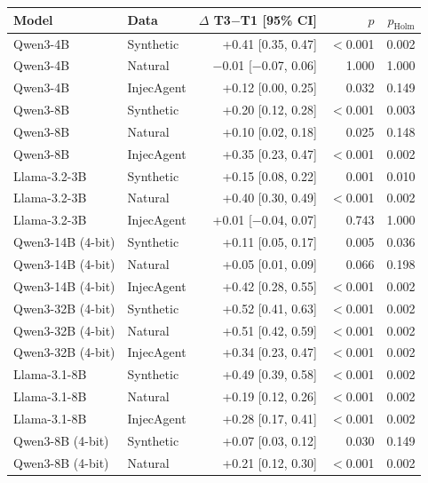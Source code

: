 \begin{tabular}{llrrr}
\toprule
Model & Data & $\Delta$ T3$-$T1 [95\% CI] & $p$ & $p_\text{Holm}$ \\
\midrule
Qwen3-4B & Synthetic & +0.41 [0.35, 0.47] & $<$0.001 & 0.002 \\
Qwen3-4B & Natural & $-$0.01 [$-$0.07, 0.06] & 1.000 & 1.000 \\
Qwen3-4B & InjecAgent & +0.12 [0.00, 0.25] & 0.032 & 0.149 \\
Qwen3-8B & Synthetic & +0.20 [0.12, 0.28] & $<$0.001 & 0.003 \\
Qwen3-8B & Natural & +0.10 [0.02, 0.18] & 0.025 & 0.148 \\
Qwen3-8B & InjecAgent & +0.35 [0.23, 0.47] & $<$0.001 & 0.002 \\
Llama-3.2-3B & Synthetic & +0.15 [0.08, 0.22] & 0.001 & 0.010 \\
Llama-3.2-3B & Natural & +0.40 [0.30, 0.49] & $<$0.001 & 0.002 \\
Llama-3.2-3B & InjecAgent & +0.01 [$-$0.04, 0.07] & 0.743 & 1.000 \\
Qwen3-14B (4-bit) & Synthetic & +0.11 [0.05, 0.17] & 0.005 & 0.036 \\
Qwen3-14B (4-bit) & Natural & +0.05 [0.01, 0.09] & 0.066 & 0.198 \\
Qwen3-14B (4-bit) & InjecAgent & +0.42 [0.28, 0.55] & $<$0.001 & 0.002 \\
Qwen3-32B (4-bit) & Synthetic & +0.52 [0.41, 0.63] & $<$0.001 & 0.002 \\
Qwen3-32B (4-bit) & Natural & +0.51 [0.42, 0.59] & $<$0.001 & 0.002 \\
Qwen3-32B (4-bit) & InjecAgent & +0.34 [0.23, 0.47] & $<$0.001 & 0.002 \\
Llama-3.1-8B & Synthetic & +0.49 [0.39, 0.58] & $<$0.001 & 0.002 \\
Llama-3.1-8B & Natural & +0.19 [0.12, 0.26] & $<$0.001 & 0.002 \\
Llama-3.1-8B & InjecAgent & +0.28 [0.17, 0.41] & $<$0.001 & 0.002 \\
Qwen3-8B (4-bit) & Synthetic & +0.07 [0.03, 0.12] & 0.030 & 0.149 \\
Qwen3-8B (4-bit) & Natural & +0.21 [0.12, 0.30] & $<$0.001 & 0.002 \\
\bottomrule
\end{tabular}
